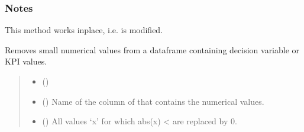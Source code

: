 \documentclass[letterpaper,10pt,english]{sphinxmanual}
\begin{document}
\begin{fulllineitems}
\begin{fulllineitems}
\subsubsection*{Notes}

\sphinxAtStartPar
This method works inplace, i.e.  is modified.

\end{fulllineitems}


\begin{fulllineitems}
\label{\detokenize{generated/tamos.data_IO.ResultsExport:tamos.data_IO.ResultsExport.remove_small_values}}
\pysigstartsignatures
{}
\pysigstopsignatures
\sphinxAtStartPar
Removes small numerical values from a dataframe containing decision variable or KPI values.
\begin{quote}\begin{description}
\begin{itemize}
\item {} 
\sphinxAtStartPar
{} () \textendash{} 

\item {} 
\sphinxAtStartPar
{} () \textendash{} Name of the column of  that contains the numerical values.

\item {} 
\sphinxAtStartPar
{} (\sphinxstyleliteralemphasis{\sphinxupquote{, }}\sphinxstyleliteralemphasis{\sphinxupquote{, }}) \textendash{} All values ‘x’ for which abs(x) \textless{}  are replaced by 0.


\end{itemize}
\end{description}
\end{quote}
\end{fulllineitems}
\end{fulllineitems}
\end{document}
